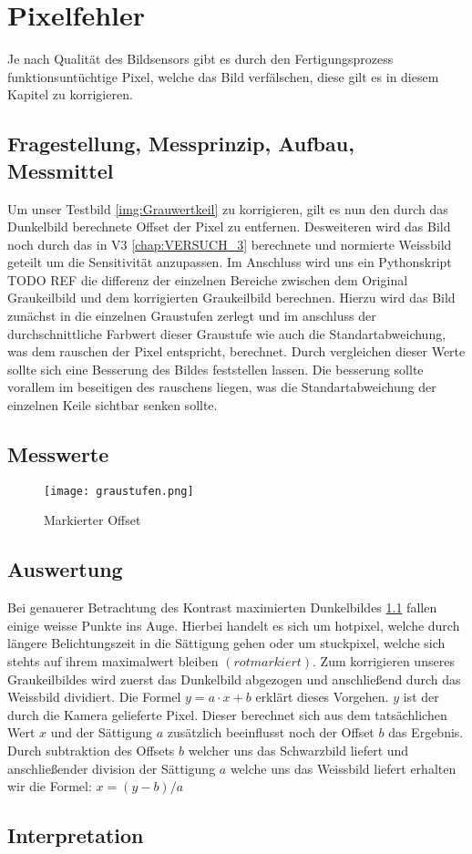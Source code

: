 %
%
\chapter{Pixelfehler}
Je nach Qualität des Bildsensors gibt es durch den Fertigungsprozess funktionsuntüchtige Pixel, welche das Bild verfälschen, diese gilt es in diesem Kapitel zu korrigieren.
\label{chap:Pixelfehler}

\section{Fragestellung, Messprinzip, Aufbau, Messmittel}
Um unser Testbild \ref{img:Grauwertkeil} zu korrigieren, gilt es nun den durch das Dunkelbild berechnete Offset der Pixel zu entfernen. Desweiteren wird das Bild noch durch das in V3 \ref{chap:VERSUCH_3} berechnete und normierte Weissbild geteilt um die Sensitivität anzupassen.
Im Anschluss wird uns ein Pythonskript TODO REF die differenz der einzelnen Bereiche zwischen dem Original Graukeilbild und dem korrigierten Graukeilbild berechnen. Hierzu wird das Bild zunächst in die einzelnen Graustufen zerlegt und im anschluss der durchschnittliche Farbwert dieser Graustufe wie auch die Standartabweichung, was dem rauschen der Pixel entspricht, berechnet. Durch vergleichen dieser Werte sollte sich eine Besserung des Bildes feststellen lassen. Die besserung sollte vorallem im beseitigen des rauschens liegen, was die Standartabweichung der einzelnen Keile sichtbar senken sollte.
\label{chap:VERSUCH_4_FRAGESTELLUNG}

\section{Messwerte}
\begin{figure}[H]
\centering
\texttt{[image: graustufen.png]}
\caption{Markierter Offset}
\label{img:struckpixel.png}
\end{figure}
\label{chap:VERSUCH_4_MESSWERTE}

\section{Auswertung}
Bei genauerer Betrachtung des Kontrast maximierten Dunkelbildes \ref{img:struckpixel.png} fallen einige weisse Punkte ins Auge. Hierbei handelt es sich um hotpixel, welche durch längere Belichtungszeit in die Sättigung gehen oder um stuckpixel, welche sich stehts auf ihrem maximalwert bleiben $(rot markiert)$.
Zum korrigieren unseres Graukeilbildes wird zuerst das Dunkelbild abgezogen und anschließend durch das Weissbild dividiert. Die Formel $y = a\cdot x+b$ erklärt dieses Vorgehen. $y$ ist der durch die Kamera gelieferte Pixel. Dieser berechnet sich aus dem tatsächlichen Wert $x$ und der Sättigung $a$ zusätzlich beeinflusst noch der Offset $b$ das Ergebnis. Durch subtraktion des Offsets $b$ welcher uns das Schwarzbild liefert und anschließender division der Sättigung $a$ welche uns das Weissbild liefert erhalten wir die Formel: $x = (y-b)/a$ 
\label{chap:VERSUCH_4_AUSWERTUNG}

\section{Interpretation}
\label{chap:VERSUCH_4_INTERPRETATION}